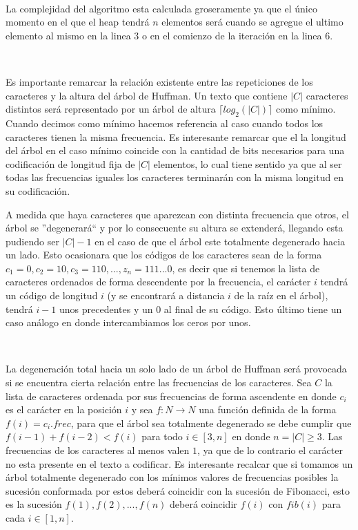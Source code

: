 ~

La complejidad del algoritmo esta calculada groseramente ya que el \'unico momento en el que el heap tendr\'a $n$ elementos ser\'a cuando se agregue el ultimo elemento al mismo en la linea $3$ o en el comienzo de la iteraci\'on en la linea $6$.

~

Es importante remarcar la relaci\'on existente entre las repeticiones de los caracteres y la altura del \'arbol de Huffman. Un texto que contiene $|C|$ caracteres distintos ser\'a representado por un \'arbol de altura $\lceil log_2(|C|) \rceil$ como m\'inimo. Cuando decimos como m\'inimo hacemos referencia al caso cuando todos los caracteres tienen la misma frecuencia. Es interesante remarcar que el la longitud del \'arbol en el caso m\'inimo coincide con la cantidad de bits necesarios para una codificaci\'on de longitud fija de $|C|$ elementos, lo cual tiene sentido ya que al ser todas las frecuencias iguales los caracteres terminar\'an con la misma longitud en su codificaci\'on.

A medida que haya caracteres que aparezcan con distinta frecuencia que otros, el \'arbol se ''degenerar\'a`` y por lo consecuente su altura se extender\'a, llegando esta pudiendo ser $|C|-1$ en el caso de que el \'arbol este totalmente degenerado hacia un lado. Esto ocasionara que los c\'odigos de los caracteres sean de la forma $c_1=0, c_2=10, c_3=110, ... , z_n = 111...0$, es decir que si tenemos la lista de caracteres ordenados de forma descendente por la frecuencia, el car\'acter $i$ tendr\'a un c\'odigo de longitud $i$ (y se encontrar\'a a distancia $i$ de la ra\'iz en el \'arbol), tendr\'a $i-1$ unos precedentes y un $0$ al final de su c\'odigo. Esto \'ultimo tiene un caso an\'alogo en donde intercambiamos los ceros por unos.

~

La degeneraci\'on total hacia un solo lado de un \'arbol de Huffman ser\'a provocada si se encuentra cierta relaci\'on entre las frecuencias de los caracteres. Sea $C$ la lista de caracteres ordenada por sus frecuencias de forma ascendente en donde $c_i$ es el car\'acter en la posici\'on $i$ y sea $f: N \rightarrow N$ una funci\'on definida de la forma $f(i) = c_i.frec$, para que el \'arbol sea totalmente degenerado se debe cumplir que $f(i-1) + f(i-2) < f(i)$ para todo $i \in [3, n]$ en donde $n=|C| \geq 3$. Las frecuencias de los caracteres al menos valen $1$, ya que de lo contrario el car\'acter no esta presente en el texto a codificar. Es interesante recalcar que si tomamos un \'arbol totalmente degenerado con los m\'inimos valores de frecuencias posibles la sucesi\'on conformada por estos deber\'a coincidir con la sucesi\'on de Fibonacci, esto es la sucesi\'on $f(1), f(2), ..., f(n)$ deber\'a coincidir $f(i)$ con $fib(i)$ para cada $i \in [1,n]$.

